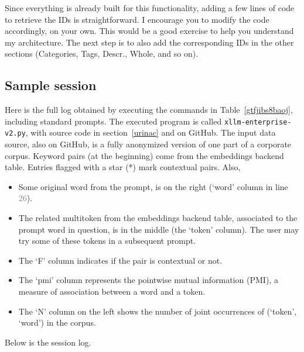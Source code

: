 \documentclass[10pt]{article}
\begin{document}
{Since everything is already built for this functionality, 
adding a few lines of code to retrieve the IDs is straightforward. I encourage you to modify the code accordingly, on your own.
This would be a good exercise to help you understand my architecture. The next step is to also add the corresponding IDs
 in the other sections (Categories, Tags, Descr., Whole,  and so on). 





\subsection{Sample session}\label{ssesse}

Here is the full log obtained by executing the commands in Table~\ref{gtfjibs8baoj}, including standard prompts. 
The executed program is called \texttt{xllm-enterprise-v2.py}, with source code in section~\ref{urinac} and on GitHub.
The input data source, also on GitHub, is a fully anonymized version of one part of a corporate corpus. Keyword pairs (at the beginning)
 come from the embeddings backend table. Entries flagged with a star (*) mark contextual pairs. Also, 
\vspace{1ex}
\begin{itemize}
\item Some original word from the prompt, is on the right (`word' column in line \textcolor{gray}{26}).  
\item The related \textcolor{index}{multitoken} from the \textcolor{index}{embeddings} backend table, associated to the prompt word in question, is in the middle (the `token' column). The user may try some of these tokens
 in a subsequent prompt. 
\item The `F' column indicates if the pair is contextual or not.
\item The `pmi' column represents the pointwise mutual information (\textcolor{index}{PMI}), a measure of association between a word and a token.
\item The `N' column on the left shows the number of joint occurrences of (`token', `word') in the corpus.
\end{itemize}
\vspace{1ex}
\noindent Below is the session log.
\vspace{1ex}

}
\end{document}
